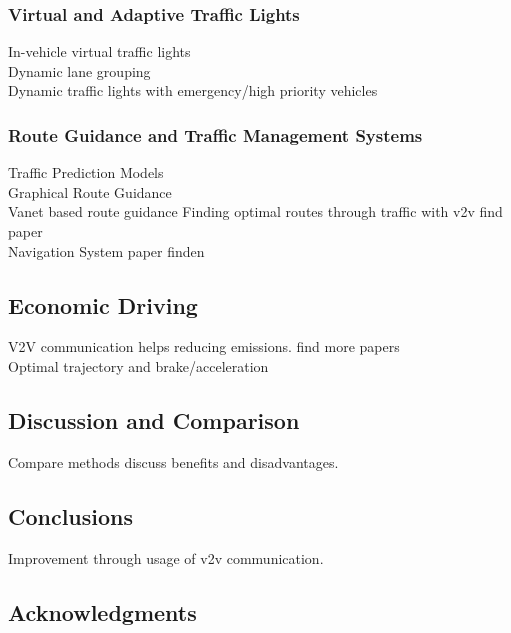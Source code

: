\documentclass{sig-alternate}
\begin{document}
\subsubsection{Virtual and Adaptive Traffic Lights}
In-vehicle virtual traffic lights\cite{ferreira2010self}  \cite{gradinescu2007adaptive} \\ 
Dynamic lane grouping \cite{6338840} \\
Dynamic traffic lights with emergency/high priority vehicles \cite{6799827} \\
\subsubsection{Route Guidance and Traffic Management Systems}
Traffic Prediction Models \cite{6685576} \\
Graphical Route Guidance \cite{5410169} \\
Vanet based route guidance \cite{6799873}
Finding optimal routes through traffic with v2v  find paper \\
Navigation System paper finden\\
\subsection{Economic Driving}
V2V communication helps reducing emissions. find more papers \\
Optimal trajectory and brake/acceleration \cite{6856456} 
\subsection{Discussion and Comparison} Compare methods discuss benefits and disadvantages.
\subsection{Conclusions}
Improvement through usage of v2v communication. 

\subsection{Acknowledgments}


%

%
%
%


\end{document}
